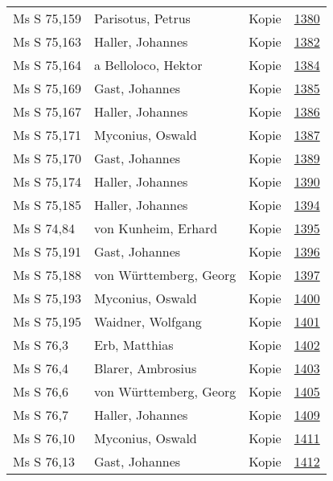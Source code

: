 \documentclass[10pt,a4paper,landscape]{report}
\begin{document}
\begin{longtable}{p{16cm}p{4cm}lr}
Ms S 75,159	&	Parisotus, Petrus	&	Kopie	&	\href{http://130.60.24.72/assignment/1380}{1380}\\
Ms S 75,163	&	Haller, Johannes	&	Kopie	&	\href{http://130.60.24.72/assignment/1382}{1382}\\
Ms S 75,164	&	a Belloloco, Hektor	&	Kopie	&	\href{http://130.60.24.72/assignment/1384}{1384}\\
Ms S 75,169	&	Gast, Johannes	&	Kopie	&	\href{http://130.60.24.72/assignment/1385}{1385}\\
Ms S 75,167	&	Haller, Johannes	&	Kopie	&	\href{http://130.60.24.72/assignment/1386}{1386}\\
Ms S 75,171	&	Myconius, Oswald	&	Kopie	&	\href{http://130.60.24.72/assignment/1387}{1387}\\
Ms S 75,170	&	Gast, Johannes	&	Kopie	&	\href{http://130.60.24.72/assignment/1389}{1389}\\
Ms S 75,174	&	Haller, Johannes	&	Kopie	&	\href{http://130.60.24.72/assignment/1390}{1390}\\
Ms S 75,185	&	Haller, Johannes	&	Kopie	&	\href{http://130.60.24.72/assignment/1394}{1394}\\
Ms S 74,84	&	von Kunheim, Erhard	&	Kopie	&	\href{http://130.60.24.72/assignment/1395}{1395}\\
Ms S 75,191	&	Gast, Johannes	&	Kopie	&	\href{http://130.60.24.72/assignment/1396}{1396}\\
Ms S 75,188	&	von Württemberg, Georg	&	Kopie	&	\href{http://130.60.24.72/assignment/1397}{1397}\\
Ms S 75,193	&	Myconius, Oswald	&	Kopie	&	\href{http://130.60.24.72/assignment/1400}{1400}\\
Ms S 75,195	&	Waidner, Wolfgang	&	Kopie	&	\href{http://130.60.24.72/assignment/1401}{1401}\\
Ms S 76,3	&	Erb, Matthias	&	Kopie	&	\href{http://130.60.24.72/assignment/1402}{1402}\\
Ms S 76,4	&	Blarer, Ambrosius	&	Kopie	&	\href{http://130.60.24.72/assignment/1403}{1403}\\
Ms S 76,6	&	von Württemberg, Georg	&	Kopie	&	\href{http://130.60.24.72/assignment/1405}{1405}\\
Ms S 76,7	&	Haller, Johannes	&	Kopie	&	\href{http://130.60.24.72/assignment/1409}{1409}\\
Ms S 76,10	&	Myconius, Oswald	&	Kopie	&	\href{http://130.60.24.72/assignment/1411}{1411}\\
Ms S 76,13	&	Gast, Johannes	&	Kopie	&	\href{http://130.60.24.72/assignment/1412}{1412}\\

\end{longtable}
\end{document}
